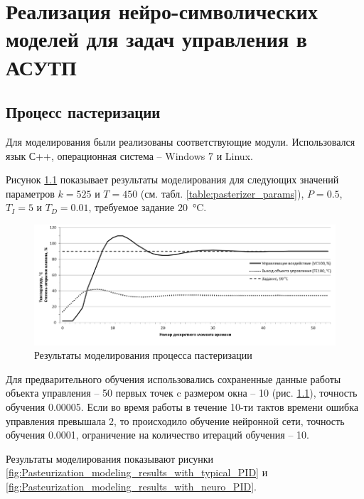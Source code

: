 \chapter{Реализация нейро-символических моделей для задач управления в АСУТП}

\section{Процесс пастеризации}

Для моделирования были реализованы соответствующие модули. Использовался язык С++, операционная система – Windows 7 и Linux.

Рисунок \ref{fig:Pasteurization_modeling_results} показывает результаты моделирования для следующих значений параметров $k = 525$ и $T = 450$ (см. табл. \ref{table:pasterizer_params}), $P = 0.5$, $T_I = 5$ и $T_D = 0.01$, требуемое задание \SI{20}{\celsius}.

\begin{figure}[H]
    \centering
    \includegraphics[width=\textwidth]{images/chapter_4/Pasteurization_modeling_results.png}
    \caption{Результаты моделирования процесса пастеризации}
    \label{fig:Pasteurization_modeling_results}
\end{figure}

Для предварительного обучения использовались сохраненные данные работы объекта управления – 50 первых точек c размером окна – 10 (рис. \ref{fig:Pasteurization_modeling_results}), точность обучения 0.00005. Если во время работы в течение 10-ти тактов времени ошибка управления превышала 2, то происходило обучение нейронной сети, точность обучения 0.0001, ограничение на количество итераций обучения – 10.

Результаты моделирования показывают рисунки \ref{fig:Pasteurization_modeling_results_with_typical_PID} и \ref{fig:Pasteurization_modeling_results_with_neuro_PID}.

